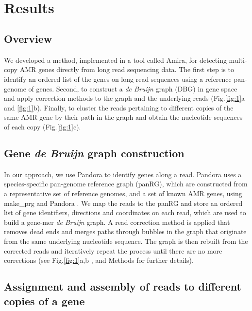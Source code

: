 \section*{Results}

\subsection*{Overview}
\paragraph{}
We developed a method, implemented in a tool called Amira, for detecting multi-copy AMR genes directly from long read sequencing data. The first step is to identify an ordered list of the genes on long read sequences using a reference pan-genome of genes. Second, to construct a \textit{de Bruijn} graph (DBG) in gene space and apply correction methods to the graph and the underlying reads (Fig.\ref{fig:1}a and \ref{fig:1}b). Finally, to cluster the reads pertaining to different copies of the same AMR gene by their path in the graph and obtain the nucleotide sequences of each copy (Fig.\ref{fig:1}c). 

\subsection*{Gene \textit{de Bruijn} graph construction}
\paragraph{}
In our approach, we use Pandora to identify genes along a read. Pandora uses a species-specific pan-genome reference graph (panRG), which are constructed from a representative set of reference genomes, and a set of known AMR genes, using make\_prg and Pandora \cite{pandora}. We map the reads to the panRG and store an ordered list of gene identifiers, directions and coordinates on each read, which are used to build a gene-mer \textit{de Bruijn} graph. A read correction method is applied that removes dead ends and merges paths through bubbles in the graph that originate from the same underlying nucleotide sequence. The graph is then rebuilt from the corrected reads and iteratively repeat the process until there are no more corrections (see Fig.\ref{fig:1}a,b , and Methods for further details).

\subsection*{Assignment and assembly of reads to different copies of a gene}
